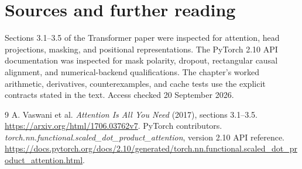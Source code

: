 \chapter*{Sources and further reading}
Sections 3.1--3.5 of the Transformer paper were inspected for attention, head projections, masking, and positional representations. The PyTorch 2.10 API documentation was inspected for mask polarity, dropout, rectangular causal alignment, and numerical-backend qualifications. The chapter's worked arithmetic, derivatives, counterexamples, and cache tests use the explicit contracts stated in the text. Access checked 20 September 2026.

\begingroup\let\chapter\section
\begin{thebibliography}{9}
 A. Vaswani et al. \emph{Attention Is All You Need} (2017), sections 3.1--3.5.
\url{https://arxiv.org/html/1706.03762v7}.
 PyTorch contributors. \emph{torch.nn.functional.scaled\_dot\_product\_attention}, version 2.10 API reference.
\url{https://docs.pytorch.org/docs/2.10/generated/torch.nn.functional.scaled_dot_product_attention.html}.
\end{thebibliography}
\endgroup
